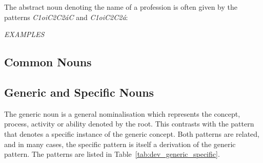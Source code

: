 \documentclass[grammar]{subfiles}
\begin{document}
	The abstract noun denoting the name of a profession is often given by the patterns \textit{C\sub1oiC\sub2C\sub2áC} and \textit{C\sub1oiC\sub2C\sub2á}:

	\begin{exe}
		\ex \emph{EXAMPLES}
	\end{exe}

	\subsection{Common Nouns}
	\label{ssec:dev_common_nouns}

	\ToBeWritten

	\subsection{Generic and Specific Nouns}
	\label{ssec:dev_generic_nouns}

	The generic noun is a general nominalisation which represents the concept, process, activity or ability denoted by the root. This contrasts with the pattern that denotes a specific instance of the generic concept. Both patterns are related, and in many cases, the specific pattern is itself a derivation of the generic pattern. The patterns are listed in Table~\ref{tab:dev_generic_specific}.
\end{document}
